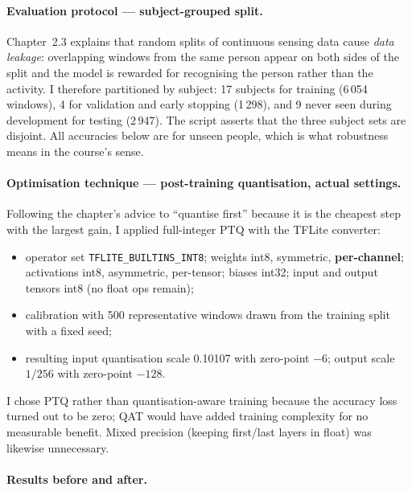 \documentclass[10pt,a4paper]{article}
\begin{document}
\paragraph{Evaluation protocol --- subject-grouped split.} Chapter~2.3 explains that random splits of continuous sensing data cause \emph{data leakage}: overlapping windows from the same person appear on both sides of the split and the model is rewarded for recognising the person rather than the activity. I therefore partitioned by subject: 17 subjects for training (6\,054 windows), 4 for validation and early stopping (1\,298), and 9 never seen during development for testing (2\,947). The script asserts that the three subject sets are disjoint. All accuracies below are for unseen people, which is what robustness means in the course's sense.

\paragraph{Optimisation technique --- post-training quantisation, actual settings.} Following the chapter's advice to ``quantise first'' because it is the cheapest step with the largest gain, I applied full-integer PTQ with the TFLite converter:
\begin{itemize}
  \item operator set \texttt{TFLITE\_BUILTINS\_INT8}; weights int8, symmetric, \textbf{per-channel}; activations int8, asymmetric, per-tensor; biases int32; input and output tensors int8 (no float ops remain);
  \item calibration with 500 representative windows drawn from the training split with a fixed seed;
  \item resulting input quantisation scale 0.10107 with zero-point $-6$; output scale $1/256$ with zero-point $-128$.
\end{itemize}
I chose PTQ rather than quantisation-aware training because the accuracy loss turned out to be zero; QAT would have added training complexity for no measurable benefit. Mixed precision (keeping first/last layers in float) was likewise unnecessary.

\paragraph{Results before and after.}
\end{document}
